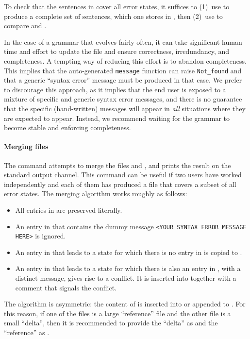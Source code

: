 \documentclass[onecolumn,11pt,nocopyrightspace,preprint]{sigplanconf}
\begin{document}
To check that the sentences in  cover all error states, it
suffices to (1)~use \olisterrors to produce a complete set of sentences,
which one stores in , then (2)~use \ocompareerrors to
compare  and .

In the case of a grammar that evolves fairly often, it can take significant
human time and effort to update the \messages file and ensure correctness,
irredundancy, and completeness. A tempting way of reducing this effort is to abandon
completeness. This implies that the auto-generated \verb+message+ function can
raise \verb+Not_found+ and that a generic ``syntax error'' message must be
produced in that case. We prefer to discourage this approach, as it implies
that the end user is exposed to a mixture of specific and generic syntax error
messages, and there is no guarantee that the specific (hand-written) messages
will appear in \emph{all} situations where they are expected to appear.
Instead, we recommend waiting for the grammar to become stable and enforcing
completeness.

\paragraph{Merging \messages files}
\label{sec:messages:merge}

The command \omergeerrors {} \omergeerrors {} attempts
to merge the \messages files  and , and prints the
result on the standard output channel. This command can be useful if two users
have worked independently and each of them has produced a \messages file that
covers a subset of all error states. The merging algorithm works roughly as
follows:
%
\begin{itemize}
\item All entries in  are preserved literally.
\item An entry in  that contains the dummy message
  \verb+<YOUR SYNTAX ERROR MESSAGE HERE>+ is ignored.
\item An entry in  that leads to a state for which
  there is no entry in  is copied to .
\item An entry in  that leads to a state for which
  there is also an entry in , with a distinct message,
  gives rise to a conflict. It is inserted into 
  together with a comment that signals the conflict.
\end{itemize}
%
The algorithm is asymmetric: the content of  is inserted into or
appended to . For this reason, if one of the files is a large
``reference'' file and the other file is a small ``delta'', then it is
recommended to provide the ``delta'' as  and the ``reference''
as .
\end{document}
